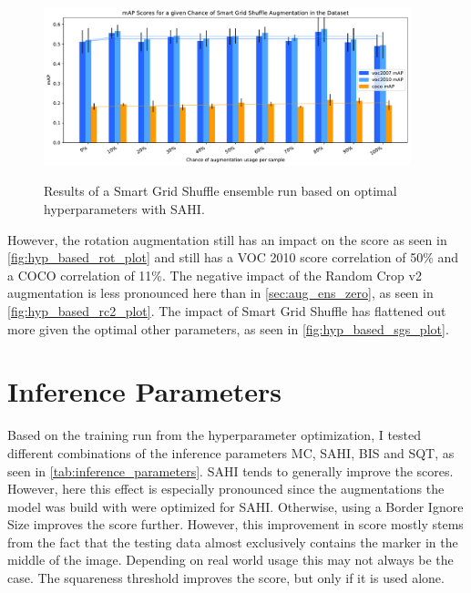 \documentclass[10pt]{book}
\newcommand{\figureref}[1]{\autoref{#1}}
\begin{document}
\begin{figure}
  \caption{Results of a Smart Grid Shuffle ensemble run based on optimal hyperparameters with \ac{SAHI}.}
  \includegraphics[width=0.95\textwidth]{image/hyp-based-sgs-sahi-ensemble-2-thesis}
  \label{fig:hyp_based_sgs_plot}
\end{figure}

However, the rotation augmentation still has an impact on the score as seen in \figureref{fig:hyp_based_rot_plot} and still has a VOC 2010 score correlation of 50\% and a \ac{COCO} correlation of 11\%. The negative impact of the Random Crop v2 augmentation is less pronounced here than in \autoref{sec:aug_ens_zero}, as seen in \figureref{fig:hyp_based_rc2_plot}. The impact of Smart Grid Shuffle has flattened out more given the optimal other parameters, as seen in \figureref{fig:hyp_based_sgs_plot}.

\section{Inference Parameters}
\label{sec:inference_params}

Based on the training run from the hyperparameter optimization, I tested different combinations of the inference parameters \ac{MC}, \ac{SAHI}, \ac{BIS} and \ac{SQT}, as seen in \autoref{tab:inference_parameters}. \ac{SAHI} tends to generally improve the scores. However, here this effect is especially pronounced since the augmentations the model was build with were optimized for \ac{SAHI}. Otherwise, using a Border Ignore Size improves the score further. However, this improvement in score mostly stems from the fact that the testing data almost exclusively contains the marker in the middle of the image. Depending on real world usage this may not always be the case. The squareness threshold improves the score, but only if it is used alone. 
\end{document}
